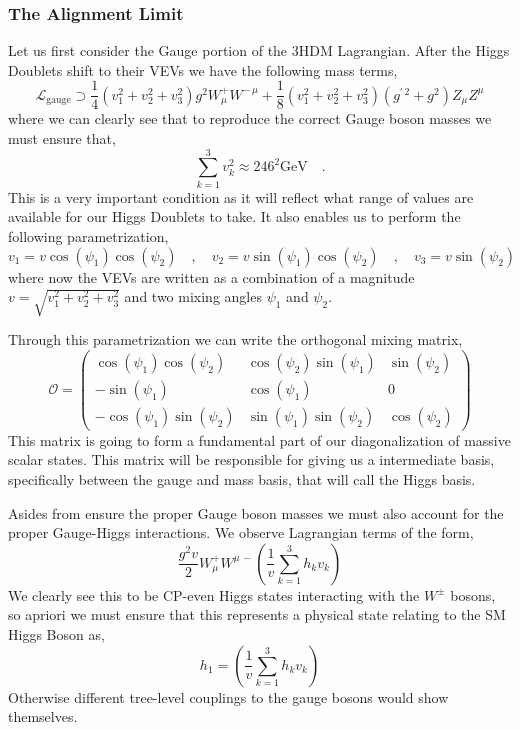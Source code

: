\subsubsection{The Alignment Limit}

Let us first consider the Gauge portion of the 3HDM Lagrangian. After the Higgs Doublets shift to their VEVs we have the following mass terms, 
%
\begin{equation}
\mathcal{L}_{\text{gauge}} \supset \frac{1}{4} \left( v_1^2 + v_2^2  + v_3^2 \right) g^2 W^+_\mu W^{-\,\mu} + \frac{1}{8} \left(  v_1^2 + v_2^2  + v_3^2  \right) \left( g^{\prime \, 2} + g^2 \right) Z_\mu Z^\mu  
\end{equation}
where we can clearly see that to reproduce the correct Gauge boson masses we must ensure that, 
\begin{equation}
\label{eq:VEV_Condition}
\sum_{k=1}^3 v_k^2 \approx 246^2 \text{GeV} \quad . 
\end{equation}
This is a very important condition as it will reflect what range of values are available for our Higgs Doublets to take.
%
It also enables us to perform the following parametrization,
%
\begin{equation}
v_1 = v \cos(\psi_1) \cos(\psi_2) \quad , \quad v_2 = v \sin(\psi_1) \cos(\psi_2) \quad , \quad v_3 = v \sin(\psi_2)
\end{equation}
where now the VEVs are written as a combination of a magnitude $v=\sqrt{v_1^2 + v_2^2 + v_3^2 }$ and two mixing angles $\psi_1$ and $\psi_2$. 

Through this parametrization we can write the orthogonal mixing matrix, 
\begin{equation}
\label{eq:3HDM_Orthg}
\mathcal{O} = 
\begin{pmatrix}
\cos(\psi_1) \cos(\psi_2) & \cos(\psi_2) \sin(\psi_1) & \sin(\psi_2) \\ 
- \sin(\psi_1) & \cos(\psi_1) & 0 \\ 
- \cos(\psi_1) \sin(\psi_2) & \sin(\psi_1) \sin(\psi_2) & \cos(\psi_2)
\end{pmatrix}
\end{equation}
%
This matrix is going to form a fundamental part of our diagonalization of massive scalar states. 
% 
This matrix will be responsible for giving us a intermediate basis, specifically between the gauge and mass basis, that will call the Higgs basis.

Asides from ensure the proper Gauge boson masses we must also account for the proper Gauge-Higgs interactions. We observe Lagrangian terms of the form, 
\begin{equation}
\frac{g^2 v}{2} W^+_\mu W^{\mu \, -} \left( \frac{1}{v} \sum_{k=1}^3 h_k v_k \right) 
\end{equation}
We clearly see this to be CP-even Higgs states interacting with the $W^\pm$ bosons, so apriori we must ensure that this represents a physical state relating to the SM Higgs Boson as, 
\begin{equation}
h_1 = \left( \frac{1}{v} \sum_{k=1}^3 h_k v_k \right) 
\end{equation}
Otherwise different tree-level couplings to the gauge bosons would show themselves. 

